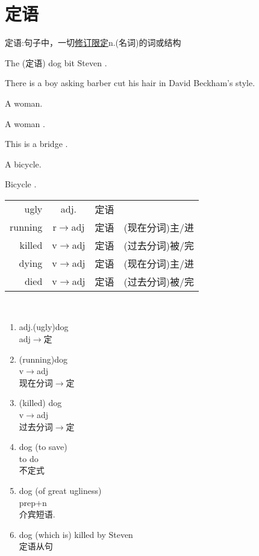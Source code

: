 \section{定语}
\begin{definition}
	定语:句子中，一切\uline{修订限定}n.(名词)的词或结构
\end{definition}
\begin{example}
	The (定语) dog bit  Steven .
\end{example}
\begin{example}
	There is a boy asking barber cut his hair in David Beckham's style.
\end{example}
\begin{example}
	A  woman.
\end{example}
\begin{example}
		A woman .
\end{example}
\begin{example}
	This is a bridge .
\end{example}
\begin{example}
	A  bicycle.
\end{example}
\begin{example}
	Bicycle .
\end{example}
\begin{tabular}{rcll}
	ugly&adj.&定语&\\
	running&r$\rightarrow$adj&定语&(现在分词)主/进\\
	killed&v$\rightarrow$adj&定语&(过去分词)被/完\\
	dying&v$\rightarrow$adj&定语&(现在分词)主/进\\
	died&v$\rightarrow$adj&定语&(过去分词)被/完
\end{tabular}
\\
\begin{enumerate}
	\item adj.(ugly)dog\\adj$\rightarrow$定
	\item (running)dog\\v$\rightarrow$adj\\现在分词$\rightarrow$定
	\item (killed) dog\\v$\rightarrow$adj\\过去分词$\rightarrow$定
	\item dog (to save)\\to do\\不定式
	\item dog (of great ugliness)\\prep+n\\介宾短语.
	\item dog (which is) killed by Steven\\定语从句
\end{enumerate}
